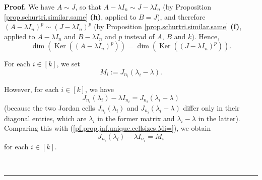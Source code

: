 \documentclass[numbers=enddot,12pt,final,onecolumn,notitlepage]{scrartcl}%
\numberwithin{exer}{subsection}
\theoremstyle{definition}
\newenvironment{proof}[1][Proof]{\noindent\textbf{#1.} }{\ \rule{0.5em}{0.5em}}
\begin{document}
\begin{proof}
We have $A\sim J$, so that $A-\lambda I_{n}\sim J-\lambda I_{n}$ (by
Proposition \ref{prop.schurtri.similar.same} \textbf{(h)}, applied to $B=J$),
and therefore $\left(  A-\lambda I_{n}\right)  ^{p}\sim\left(  J-\lambda
I_{n}\right)  ^{p}$ (by Proposition \ref{prop.schurtri.similar.same}
\textbf{(f)}, applied to $A-\lambda I_{n}$ and $B-\lambda I_{n}$ and $p$
instead of $A$, $B$ and $k$). Hence,%
\begin{equation}
\dim\left(  \operatorname*{Ker}\left(  \left(  A-\lambda I_{n}\right)
^{p}\right)  \right)  =\dim\left(  \operatorname*{Ker}\left(  \left(
J-\lambda I_{n}\right)  ^{p}\right)  \right)  .
\label{pf.prop.jnf.unique.cellsizes.dimKer1}%
\end{equation}


For each $i\in\left[  k\right]  $, we set
\begin{equation}
M_{i}:=J_{n_{i}}\left(  \lambda_{i}-\lambda\right)  .
\label{pf.prop.jnf.unique.cellsizes.Mi=}%
\end{equation}


However, for each $i\in\left[  k\right]  $, we have%
\begin{equation}
J_{n_{i}}\left(  \lambda_{i}\right)  -\lambda I_{n_{i}}=J_{n_{i}}\left(
\lambda_{i}-\lambda\right)  \label{pf.prop.jnf.unique.cellsizes.J-lam}%
\end{equation}
(because the two Jordan cells $J_{n_{i}}\left(  \lambda_{i}\right)  $ and
$J_{n_{i}}\left(  \lambda_{i}-\lambda\right)  $ differ only in their diagonal
entries, which are $\lambda_{i}$ in the former matrix and $\lambda_{i}%
-\lambda$ in the latter). Comparing this with
(\ref{pf.prop.jnf.unique.cellsizes.Mi=}), we obtain%
\begin{equation}
J_{n_{i}}\left(  \lambda_{i}\right)  -\lambda I_{n_{i}}=M_{i}
\label{pf.prop.jnf.unique.cellsizes.J-lam2}%
\end{equation}
for each $i\in\left[  k\right]  $.


\end{proof}
\end{document}
